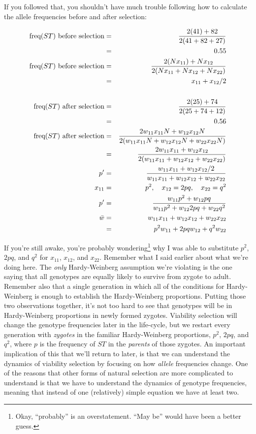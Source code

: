 If you followed that, you shouldn't have much trouble following how to
calculate the allele frequencies before and after selection:

\begin{eqnarray*}
\hbox{freq($ST$) before selection}
 &=& \frac{2(41) + 82}{2(41 + 82 + 27)} \\
 &=& 0.55 \\
\hbox{freq($ST$) before selection}
 &=& \frac{2(Nx_{11}) + Nx_{12}}{2(Nx_{11} + Nx_{12} + Nx_{22})} \\
 &=& x_{11} + x_{12}/2 \\
&& \\
\hbox{freq($ST$) after selection}
 &=& \frac{2(25) + 74}{2(25 + 74 + 12)} \\
 &=& 0.56 \\
\hbox{freq($ST$) after selection}
 &=& \frac{2w_{11}x_{11}N + w_{12}x_{12}N}{2(w_{11}x_{11}N + w_{12}x_{12}N + w_{22}x_{22}N)} \\
 &=& \frac{2w_{11}x_{11} + w_{12}x_{12}}{2(w_{11}x_{11} + w_{12}x_{12} + w_{22}x_{22})} \\
p' &=& \frac{w_{11}x_{11} + w_{12}x_{12}/2}{w_{11}x_{11} +
 w_{12}x_{12} + w_{22}x_{22}} \\
x_{11} &=& p^2, \quad x_{12} = 2pq, \quad x_{22} = q^2 \\
p' &=& \frac{w_{11}p^2 + w_{12}pq}{w_{11}p^2 + w_{12}2pq + w_{22}q^2} \\
\bar w &=& w_{11}x_{11} + w_{12}x_{12} + w_{22}x_{22} \\
       &=& p^2w_{11} + 2pqw_{12} + q^2w_{22}
\end{eqnarray*}

If you're still awake, you're probably wondering\footnote{Okay,
  ``probably'' is an overstatement. ``May be'' would have been a
  better guess.} why I was able to substitute $p^2$, $2pq$, and $q^2$
for $x_{11}$, $x_{12}$, and $x_{22}$. Remember what I said earlier
about what we're doing here. The {\it only\/} Hardy-Weinberg
assumption we're violating is the one saying that all genotypes are
equally likely to survive from zygote to adult. Remember also that a
single generation in which all of the conditions for Hardy-Weinberg is
enough to establish the Hardy-Weinberg proportions. Putting those two
observations together, it's not too hard to see that genotypes will be
in Hardy-Weinberg proportions in newly formed zygotes. Viability
selection will change the genotype frequencies later in the
life-cycle, but we restart every generation with {\it zygotes\/} in
the familiar Hardy-Weinberg proportions, $p^2$, $2pq$, and $q^2$,
where $p$ is the frequency of $ST$ in the {\it parents\/} of those
zygotes. An important implication of this
that we'll return to later, is that we can understand the dynamics of
viability selection by focusing on how {\it allele\/} frequencies
change. One of the reasons that other forms of natural selection are
more complicated to understand is that we have to understand the
dynamics of genotype frequencies, meaning that instead of one
(relatively) simple equation we have at least two.

